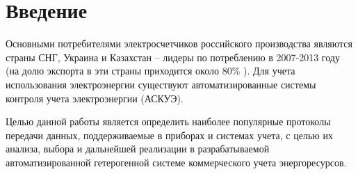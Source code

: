 \newpage

\section*{Введение}

Основными  потребителями  электросчетчиков российского производства являются страны СНГ, Украина и Казахстан – лидеры по потреблению в 2007-2013 году (на долю экспорта в эти страны приходится около  80\% \cite{rbk} ). Для учета использования электроэнергии существуют автоматизированные системы контроля учета электроэнергии (АСКУЭ).

Целью данной работы является определить наиболее популярные протоколы передачи данных, поддерживаемые в приборах и системах учета, с целью их анализа, выбора и дальнейшей реализации в разрабатываемой автоматизированной гетерогенной системе коммерческого учета энергоресурсов.